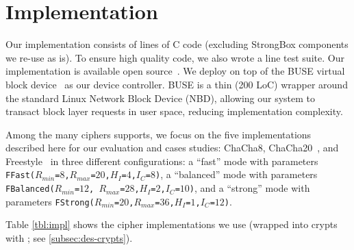 \section{Implementation}\label{sec:impl}

Our \sys implementation consists of \locTotal lines of C code (excluding
StrongBox components we re-use as is). To ensure high quality code, we also
wrote a \locTest line test suite. Our implementation is available open
source~. We deploy \sys on top of the BUSE virtual block
device~\cite{BUSE} as our device controller. BUSE is a thin (200 LoC) wrapper
around the standard Linux Network Block Device (NBD), allowing our system to
transact block layer requests in user space, reducing implementation complexity.



Among the many ciphers \sys supports, we focus on the five implementations
described here for our evaluation and cases studies: ChaCha8,
ChaCha20~\cite{ChaCha20}, and Freestyle~\cite{Freestyle} in three different
configurations: a ``fast'' mode with parameters
\texttt{FFast($R_{min}$=$8$,$R_{max}$=$20$,$H_I$=$4$,$I_C$=$8$)}, a ``balanced''
mode with parameters \texttt{FBalanced($R_{min}$=$12$,
$R_{max}$=$28$,$H_I$=$2$,$I_C$=$10$)}, and a ``strong'' mode with parameters
\texttt{FStrong($R_{min}$=$20$,$R_{max}$=$36$,$H_I$=$1$,$I_C$=$12$)}.

Table \cref{tbl:impl} shows the cipher implementations we use (wrapped into
crypts with \sysB; see \cref{subsec:des-crypts}).
